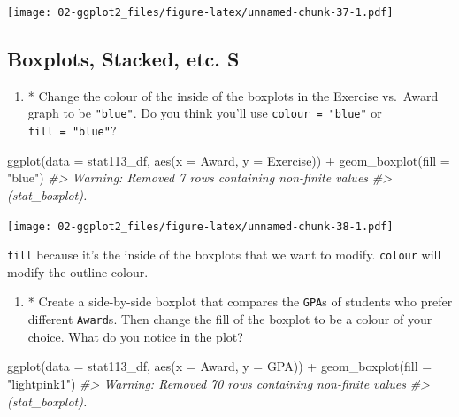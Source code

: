 \documentclass[
]{book}
\newenvironment{Shaded}{\begin{snugshade}}{\end{snugshade}}
\newcommand{\AttributeTok}[1]{\textcolor[rgb]{0.77,0.63,0.00}{#1}}
\newcommand{\CommentTok}[1]{\textcolor[rgb]{0.56,0.35,0.01}{\textit{#1}}}
\newcommand{\FunctionTok}[1]{\textcolor[rgb]{0.00,0.00,0.00}{#1}}
\newcommand{\NormalTok}[1]{#1}
\newcommand{\SpecialCharTok}[1]{\textcolor[rgb]{0.00,0.00,0.00}{#1}}
\newcommand{\StringTok}[1]{\textcolor[rgb]{0.31,0.60,0.02}{#1}}
\providecommand{\tightlist}{%
  \setlength{\itemsep}{0pt}\setlength{\parskip}{0pt}}
\begin{document}
\texttt{[image: 02-ggplot2\_files/figure-latex/unnamed-chunk-37-1.pdf]}

\hypertarget{boxplots-stacked-etc.-s}{%
\subsection{Boxplots, Stacked, etc. S}\label{boxplots-stacked-etc.-s}}

\begin{enumerate}
\def\labelenumi{\arabic{enumi}.}
\tightlist
\item
  * Change the colour of the inside of the boxplots in the Exercise vs.~Award graph to be \texttt{"blue"}. Do you think you'll use \texttt{colour\ =\ "blue"} or \texttt{fill\ =\ "blue"}?
\end{enumerate}

\begin{Shaded}
\begin{Highlighting}[]
\FunctionTok{ggplot}\NormalTok{(}\AttributeTok{data =}\NormalTok{ stat113\_df, }\FunctionTok{aes}\NormalTok{(}\AttributeTok{x =}\NormalTok{ Award, }\AttributeTok{y =}\NormalTok{ Exercise)) }\SpecialCharTok{+}
  \FunctionTok{geom\_boxplot}\NormalTok{(}\AttributeTok{fill =} \StringTok{"blue"}\NormalTok{)}
\CommentTok{\#\textgreater{} Warning: Removed 7 rows containing non{-}finite values}
\CommentTok{\#\textgreater{} (stat\_boxplot).}
\end{Highlighting}
\end{Shaded}

\texttt{[image: 02-ggplot2\_files/figure-latex/unnamed-chunk-38-1.pdf]}

\texttt{fill} because it's the inside of the boxplots that we want to modify. \texttt{colour} will modify the outline colour.

\begin{enumerate}
\def\labelenumi{\arabic{enumi}.}
\setcounter{enumi}{1}
\tightlist
\item
  * Create a side-by-side boxplot that compares the \texttt{GPA}s of students who prefer different \texttt{Award}s. Then change the fill of the boxplot to be a colour of your choice. What do you notice in the plot?
\end{enumerate}

\begin{Shaded}
\begin{Highlighting}[]
\FunctionTok{ggplot}\NormalTok{(}\AttributeTok{data =}\NormalTok{ stat113\_df, }\FunctionTok{aes}\NormalTok{(}\AttributeTok{x =}\NormalTok{ Award, }\AttributeTok{y =}\NormalTok{ GPA)) }\SpecialCharTok{+}
  \FunctionTok{geom\_boxplot}\NormalTok{(}\AttributeTok{fill =} \StringTok{"lightpink1"}\NormalTok{)}
\CommentTok{\#\textgreater{} Warning: Removed 70 rows containing non{-}finite values}
\CommentTok{\#\textgreater{} (stat\_boxplot).}
\end{Highlighting}
\end{Shaded}
\end{document}
